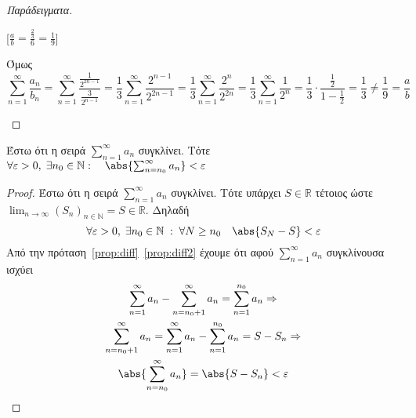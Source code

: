 \documentclass[main.tex]{subfiles}
\begin{document}
\begin{rem}
\begin{proof}[Παράδειγματα]
\begin{enumerate}[i)]
            [$ \frac{a}{b} = \frac{\frac{2}{3}}{6} = \frac{1}{9} $]

                Όμως 
                \[
                    \sum_{n=1}^{\infty} \frac{a_{n}}{b_{n}} = \sum_{n=1}^{\infty} 
                    \frac{\frac{1}{2^{2n-1}}}{\frac{3}{2^{n-1}}} = 
                    \frac{1}{3} \sum_{n=1}^{\infty} \frac{2^{n-1}}{2^{2n-1}} = 
                    \frac{1}{3} \sum_{n=1}^{\infty} \frac{2^{n}}{2^{2n}} = 
                    \frac{1}{3} \sum_{n=1}^{\infty} \frac{1}{2^{n}} = \frac{1}{3} \cdot 
                    \frac{\frac{1}{2}}{1 - \frac{1}{2}} = \frac{1}{3} \neq \frac{1}{9} 
                    = \frac{a}{b}
                 \] 
        \end{enumerate}
        
    \end{proof}
\end{rem}

\begin{prop}
    Έστω ότι η σειρά $ \sum_{n=1}^{\infty} a_{n} $ συγκλίνει. Τότε 
    $ \forall \varepsilon >0, \; \exists n_{0} \in \mathbb{N} :
    \quad \abs{\sum_{n= n_{0}}^{\infty} a_{n}} < \varepsilon $
\end{prop}
\begin{proof}
\item {}
    Έστω ότι η σειρά $ \sum_{n=1}^{\infty} a_{n} $ συγκλίνει. Τότε υπάρχει 
    $ S \in \mathbb{R} $ τέτοιος ώστε $ \lim_{n \to \infty} 
    {(S_{n})}_{n \in \mathbb{N}} = S \in \mathbb{R} $. Δηλαδή 
    \[
        \forall \varepsilon >0, \; \exists n_{0} \in \mathbb{N} \; : \; 
        \forall N \geq n_{0} \quad \abs{S_{N}-S} < \varepsilon 
    \] 
    Από την πρόταση~\ref{prop:diff}~\ref{prop:diff2} έχουμε ότι αφού 
    $ \sum_{n=1}^{\infty} a_{n} $ συγκλίνουσα ισχύει
    \begin{gather*}
        \sum_{n=1}^{\infty} a_{n} - \sum_{n= n_{0}+1}^{\infty} a_{n} = 
        \sum_{n= 1}^{n_{0}} a_{n} \Rightarrow \\ 
        \sum_{n= n_{0}+1}^{\infty} a_{n} = \sum_{n=1}^{\infty} a_{n} - 
        \sum_{n=1}^{n_{0}} a_{n} = S - S_{n} \Rightarrow \\
        \abs{\sum_{n= n_{0}}^{\infty} a_{n}} = \abs{S - S_{n}} < \varepsilon
    \end{gather*} 
\end{proof}
\end{document}
